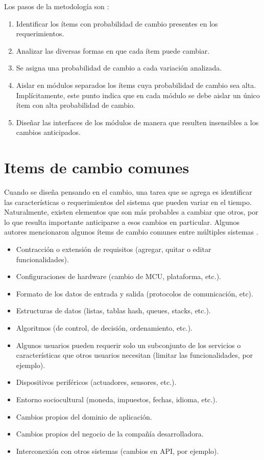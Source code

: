 Los pasos de la metodología son \cite{Parnas02, cristia2022diseno}:

\begin{enumerate}
	\item Identificar los ítems con probabilidad de cambio presentes en los requerimientos.
	\item Analizar las diversas formas en que cada ítem puede cambiar.
	\item Se asigna una probabilidad de cambio a cada variación analizada.
	\item Aislar en módulos separados los ítems cuya probabilidad de cambio sea alta. Implícitamente, este punto indica que en cada módulo se debe aislar un único ítem con alta probabilidad de cambio.
	\item Diseñar las interfaces de los módulos de manera que resulten insensibles a los cambios anticipados.

\end{enumerate}


\section{Items de cambio comunes}
\label{listaItems}

Cuando se diseña pensando en el cambio, una tarea que se agrega es identificar las características o requerimientos del sistema que pueden variar en el tiempo. Naturalmente, existen elementos que son más probables a cambiar que otros, por lo que resulta importante anticiparse a esos cambios en particular. Algunos autores mencionaron algunos ítems de cambio comunes entre múltiples sistemas \cite{Parnas02, cristia2022diseno}.

\begin{itemize}
	\item Contracción o extensión de requisitos (agregar, quitar o editar funcionalidades).
	\item Configuraciones de hardware (cambio de \gls{MCU}, plataforma, etc.).
	\item Formato de los datos de entrada y salida (protocolos de comunicación, etc).
	\item Estructuras de datos (listas, tablas hash, queues, stacks, etc.).
	\item Algoritmos (de control, de decisión, ordenamiento, etc.).
	\item Algunos usuarios pueden requerir solo un subconjunto de los servicios o características que otros usuarios necesitan (limitar las funcionalidades, por ejemplo).
	\item Dispositivos periféricos (actuadores, sensores, etc.).
	\item Entorno sociocultural (moneda, impuestos, fechas, idioma, etc.).
	\item Cambios propios del dominio de aplicación.
	\item Cambios propios del negocio de la compañía desarrolladora.
	\item Interconexión con otros sistemas (cambios en \gls{API}, por ejemplo).
\end{itemize}

